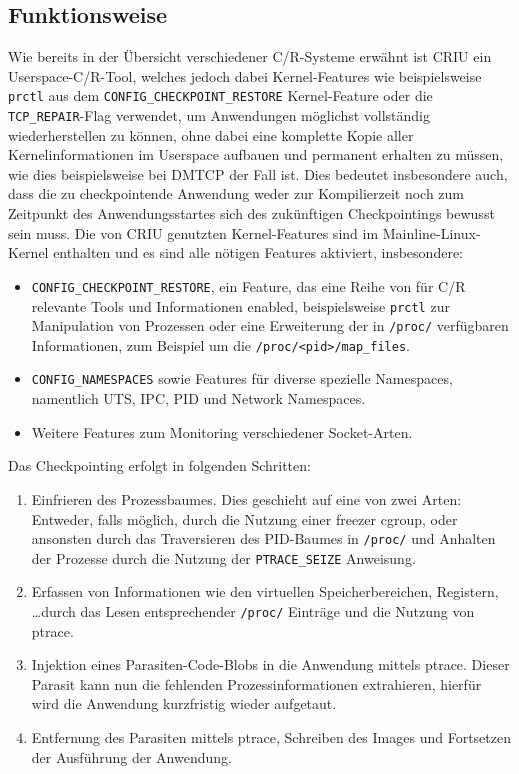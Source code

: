 \documentclass[a4paper]{article}
\begin{document}
\subsection{Funktionsweise}
Wie bereits in der Übersicht verschiedener C/R-Systeme erwähnt ist CRIU ein Userspace-C/R-Tool, welches jedoch dabei Kernel-Features wie beispielsweise \texttt{prctl} aus dem \texttt{CONFIG\_CHECKPOINT\_RESTORE} Kernel-Feature oder die \texttt{TCP\_REPAIR}-Flag\cite{tcpcr} verwendet, um Anwendungen möglichst vollständig wiederherstellen zu können, ohne dabei eine komplette Kopie aller Kernelinformationen im Userspace aufbauen und permanent erhalten zu müssen, wie dies beispielsweise bei DMTCP der Fall ist. 
Dies bedeutet insbesondere auch, dass die zu checkpointende Anwendung weder zur Kompilierzeit noch zum Zeitpunkt des Anwendungsstartes sich des zukünftigen Checkpointings bewusst sein muss.
Die von CRIU genutzten Kernel-Features sind im Mainline-Linux-Kernel enthalten und es sind alle nötigen Features aktiviert, insbesondere:
\begin{itemize}
    \item \texttt{CONFIG\_CHECKPOINT\_RESTORE}, ein Feature, das eine Reihe von für C/R relevante Tools und Informationen enabled, beispielsweise \texttt{prctl} zur Manipulation von Prozessen oder eine Erweiterung der in \texttt{/proc/} verfügbaren Informationen, zum Beispiel um die \texttt{/proc/<pid>/map\_files}. 
    \item \texttt{CONFIG\_NAMESPACES} sowie Features für diverse spezielle Namespaces, namentlich UTS, IPC, PID und Network Namespaces.
    \item Weitere Features zum Monitoring verschiedener Socket-Arten.
\end{itemize}
Das Checkpointing erfolgt in folgenden Schritten:
\begin{enumerate}
    \item Einfrieren des Prozessbaumes. Dies geschieht auf eine von zwei Arten: Entweder, falls möglich, durch die Nutzung einer freezer cgroup, oder ansonsten durch das Traversieren des PID-Baumes in \texttt{/proc/} und Anhalten der Prozesse durch die Nutzung der \texttt{PTRACE\_SEIZE} Anweisung.
    \item Erfassen von Informationen wie den virtuellen Speicherbereichen, Registern, \dots durch das Lesen entsprechender \texttt{/proc/} Einträge und die Nutzung von ptrace.
    \item Injektion eines Parasiten-Code-Blobs in die Anwendung mittels ptrace. Dieser Parasit kann nun die fehlenden Prozessinformationen extrahieren, hierfür wird die Anwendung kurzfristig wieder aufgetaut.
    \item Entfernung des Parasiten mittels ptrace, Schreiben des Images und Fortsetzen der Ausführung der Anwendung.
\end{enumerate}
\end{document}
